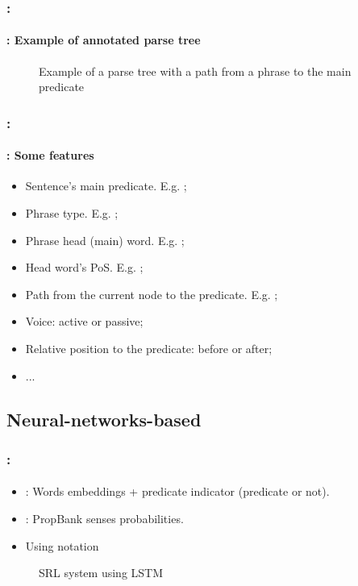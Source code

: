 \documentclass[xcolor=table]{beamer}
\begin{document}
\begin{frame}
	\frametitle{\insertshortsubtitle: \insertsection}
	\framesubtitle{\insertsubsection: Example of annotated parse tree}
	
	\vspace{-0.2cm}
	\begin{figure}
		\caption{Example of a parse tree with a path from a phrase to the main predicate \cite{2019-jurafsky-martin}}
	\end{figure}
	
\end{frame}

\begin{frame}
	\frametitle{\insertshortsubtitle: \insertsection}
	\framesubtitle{\insertsubsection: Some features}

	\begin{itemize}
		\item Sentence's main predicate. E.g. ;
		\item Phrase type. E.g. ;
		\item Phrase head (main) word. E.g. ; 
		\item Head word's PoS. E.g. ;
		\item Path from the current node to the predicate. E.g. ;
		\item Voice: active or passive;
		\item Relative position to the predicate: before or after;
		\item ...
	\end{itemize}
	
\end{frame}

\subsection{Neural-networks-based}

\begin{frame}
	\frametitle{\insertshortsubtitle: \insertsection}
	\framesubtitle{\insertsubsection}

	\begin{minipage}{.48\textwidth}
		\begin{itemize}
			\item {}: Words embeddings + predicate indicator (predicate or not).
			\item {}: PropBank senses probabilities.  
			\item Using  notation
		\end{itemize}
	\end{minipage}
	\begin{minipage}{.5\textwidth}
		\begin{figure}
			\caption{SRL system using LSTM \cite{2017-he-al}}
		\end{figure}
	\end{minipage}
	
\end{frame}
\end{document}
